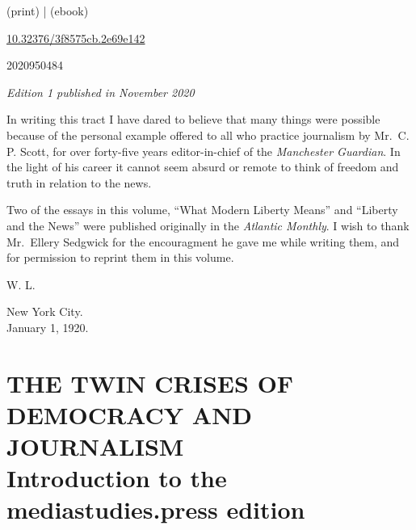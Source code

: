 \documentclass[openany,nobib,twoside,nohyper]{tufte-book}
\let\oldchapter\chapter
\def\chapter{%
  \setcounter{footnote}{0}%
  \oldchapter
}
\begin{document}
\begin{fullwidth}
\par {} (print) |  (ebook)

\par {} \href{https://doi.org/10.32376/3f8575cb.2e69e142}{10.32376/3f8575cb.2e69e142}

\par {} 2020950484

\par\textit{Edition 1 published in November 2020}






\newpage
\thispagestyle{empty}
\begingroup
\vspace*{.15in}

\setlength{\parindent}{5ex}
\huge{In writing this tract I have dared to believe that many things were
possible because of the personal example offered to all who practice
journalism by Mr.~C. P. Scott, for over forty-five years editor-in-chief
of the \emph{Manchester Guardian}. In the light of his career it cannot
seem absurd or remote to think of freedom and truth in relation to the
news.}

\huge{Two of the essays in this volume, ``What Modern Liberty Means'' and
``Liberty and the News'' were published originally in the \emph{Atlantic
Monthly}. I wish to thank Mr.~Ellery Sedgwick for the encouragment he
gave me while writing them, and for permission to reprint them in this
volume.}

\begin{flushright}W. L.\end{flushright}

\vspace*{2mm}

\noindent New York City.\\
January 1, 1920.

\endgroup
\begingroup


\LARGE

\tableofcontents

\endgroup

\end{fullwidth}

\chapter[THE TWIN CRISES OF DEMOCRACY AND JOURNALISM]{THE TWIN CRISES OF DEMOCRACY AND\\ JOURNALISM\\ Introduction to the mediastudies.press edition}
\label{ch:introduction-msp}
\end{document}
